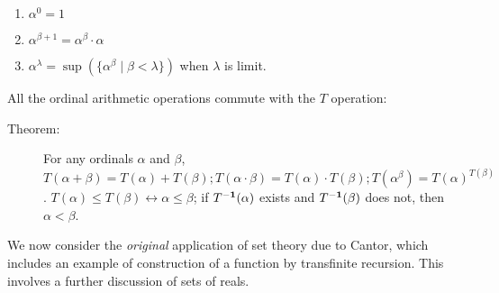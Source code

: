 \documentclass[12pt]{book}
\begin{document}
\begin{description}
\begin{enumerate}


\item $\alpha^0 = 1$

\item $\alpha^{\beta+1} = \alpha^\beta \cdot \alpha$

\item $\alpha^{\lambda} = \sup(\{\alpha^{\beta}\mid \beta<\lambda\})$ when $\lambda$ is limit.

\end{enumerate}


\end{description}

All the ordinal arithmetic operations commute with the $T$ operation:

\begin{description}

\item[Theorem:] For any ordinals $\alpha$ and $\beta$,
$T(\alpha+\beta) = T(\alpha)+T(\beta); T(\alpha\cdot\beta) =
T(\alpha)\cdot T(\beta); T(\alpha^{\beta}) = T(\alpha)^{T(\beta)}$.
$T(\alpha) \leq T(\beta) \leftrightarrow \alpha \leq \beta$; if
$T^{\bf -1}(\alpha)$ exists and $T^{\bf -1}(\beta)$ does not, then
$\alpha<\beta$.

\end{description}

\newpage

We now consider the {\em original\/} application of set theory due to
Cantor, which includes an example of construction of a function by
transfinite recursion.  This involves a further discussion of sets of
reals.
\end{document}
